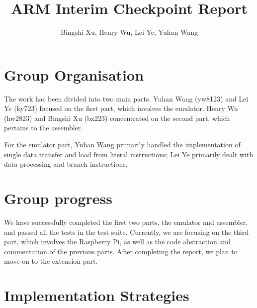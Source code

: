 \documentclass[11pt]{article}
\begin{document}
\title{ARM Interim Checkpoint Report}
\author{Bingshi Xu, Henry Wu, Lei Ye, Yuhan Wang}

\maketitle


\section{Group Organisation}

The work has been divided into two main parts. Yuhan Wang (yw8123) and Lei Ye 
(ky723) focused on the first part, which involves the emulator.
Henry Wu (hw2823) and Bingshi Xu (bx223) concentrated on the second part,
which pertains to the assembler.

For the emulator part, Yuhan Wang primarily handled the implementation of
single data transfer and load from literal instructions;
Lei Ye primarily dealt with data processing and branch instructions.

\section{Group progress}
We have successfully completed the first two parts, the emulator and assembler,
and passed all the tests in the test suite. 
Currently, we are focusing on the third part, which involves the Raspberry Pi, 
as well as the code abstraction and commentation of the previous parts. 
After completing the report, we plan to move on to the extension part.

\section{Implementation Strategies}
\end{document}
